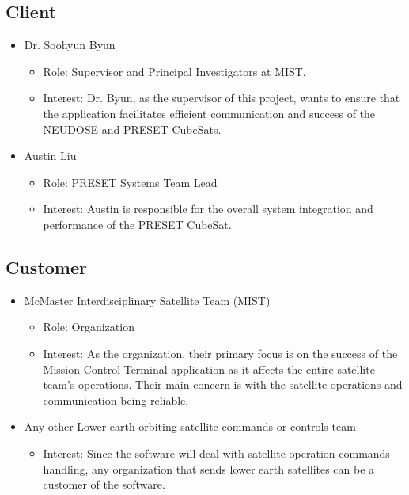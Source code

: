 \documentclass[12pt]{article}
\begin{document}
\subsection{Client}
\begin{itemize}
    \item Dr. Soohyun Byun
    \begin{itemize}
        \item Role: Supervisor and Principal Investigators at MIST.
        \item Interest: Dr. Byun, as the supervisor of this project, wants to ensure that the application facilitates efficient communication and success of the NEUDOSE and PRESET CubeSats.

        
    \end{itemize}

    \item Austin Liu
    \begin{itemize}
        \item Role: PRESET Systems Team Lead
        \item Interest: Austin is responsible for the overall system integration and performance of the PRESET CubeSat.

    \end{itemize}
\end{itemize}

\subsection{Customer}
\begin{itemize}
    \item McMaster Interdisciplinary Satellite Team (MIST)
    \begin{itemize}
        \item Role: Organization
        \item Interest: As the organization, their primary focus is on the success of the Mission Control Terminal application as it affects the entire satellite team’s operations. Their main concern is with the satellite operations and communication being reliable.

    \end{itemize}
    \item Any other Lower earth orbiting satellite commands or controls team
    \begin{itemize}
        \item Interest: Since the software will deal with satellite operation commands handling, any organization that sends lower earth satellites can be a customer of the software.

    \end{itemize}
    
\end{itemize}
\end{document}
